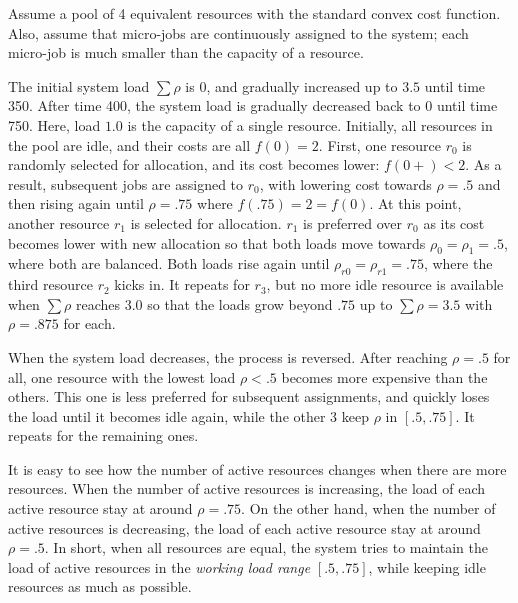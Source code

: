 Assume a pool of 4 equivalent resources with the standard convex
cost function.
Also, assume that micro-jobs are continuously assigned to the
system; each micro-job is much smaller than the capacity of a
resource.

The initial system load $\sum \rho$ is $0$, and gradually increased up
to $3.5$ until time 350. After time 400, the system load is gradually
decreased back to $0$ until time 750.
Here, load $1.0$ is the capacity of a single resource. 
Initially, all resources in the pool are idle, and their costs are
all $f(0)= 2$.
First, one resource $r_{0}$ is randomly selected for allocation, and its
cost becomes lower: $f(0+) < 2$. As a result, subsequent jobs are
assigned to $r_{0}$, with lowering cost towards $\rho = .5$ and then
rising again until $\rho = .75$ where $f(.75) = 2 = f(0)$.
At this point, another resource $r_{1}$ is selected for allocation.
$r_{1}$ is preferred over $r_{0}$ as its cost becomes lower with new
allocation so that both loads move towards $\rho_{0} = \rho_{1} = .5$,
where both are balanced.
Both loads rise again until $\rho_{r0} = \rho_{r1} = .75$,
where the third resource $r_{2}$ kicks in.
It repeats for $r_{3}$, but no more idle resource is available
when $\sum \rho$ reaches $3.0$ so that the loads grow beyond $.75$
up to $\sum \rho = 3.5$ with $\rho = .875$ for each.

When the system load decreases, the process is reversed.
After reaching $\rho = .5$ for all,
one resource with the lowest load $\rho < .5$ becomes more expensive
than the others.
This one is less preferred for subsequent assignments, and quickly
loses the load until it becomes idle again, while the other 3 keep
$\rho$ in $[.5, .75]$. It repeats for the remaining ones.

It is easy to see how the number of active resources changes when
there are more resources.
When the number of active resources is increasing, the load of each
active resource stay at around $\rho = .75$.
On the other hand, when the number of active resources is decreasing,
the load of each active resource stay at around $\rho = .5$.
In short, when all resources are equal, the system tries to maintain
the load of active resources in the {\em working load range}
$[.5, .75]$, while keeping idle resources as much as possible.

